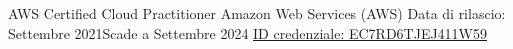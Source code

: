 \begin{cventries}
	
	\cventry
	{AWS Certified Cloud Practitioner}
	{Amazon Web Services (AWS)}
	{} %
	{} %
	{
		Data di rilascio: Settembre 2021{\enskip\cdotp\enskip}Scade a Settembre 2024
		\linebreak
		\href{https://www.credly.com/badges/e7f7cc77-9105-4970-be5b-03869780505f/public_url}{ID credenziale: EC7RD6TJEJ411W59}
	}

\end{cventries}